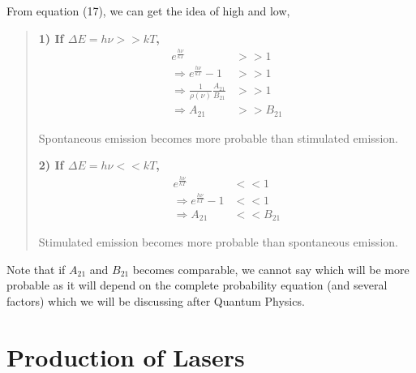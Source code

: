 \documentclass[12pt]{article}
\begin{document}
From equation (17), we can get the idea of high and low,
\begin{quote}
    \textbf{1) If $\Delta E = h\nu >> kT$,}
    \begin{align*}
        e^{\frac{h\nu}{kT}} & >> 1 \\
        \Rightarrow e^{\frac{h\nu}{kT}} - 1 & >> 1 \\
        \Rightarrow \frac{1}{\rho(\nu)} \frac{A_{21}}{B_{21}} & >> 1 \\
        \Rightarrow A_{21} & >> B_{21}
    \end{align*}

    Spontaneous emission becomes more probable than stimulated emission. \vspace{.2cm}

    \textbf{2) If $\Delta E = h\nu << kT$,}
    \begin{align*}
        e^{\frac{h\nu}{kT}} & << 1 \\
        \Rightarrow e^{\frac{h\nu}{kT}} - 1 & << 1 \\
        \Rightarrow A_{21} & << B_{21}
    \end{align*}

    Stimulated emission becomes more probable than spontaneous emission.
\end{quote}

Note that if $A_{21}$ and $B_{21}$ becomes comparable, we cannot say which will be more probable as it will depend on the complete probability equation (and several factors) which we will be discussing after Quantum Physics.

\section{Production of Lasers}
\end{document}
